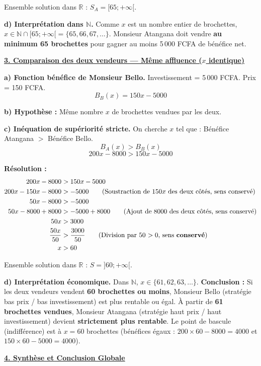 \documentclass[11pt]{article}
\begin{document}
\begin{exoresolu}
\noindent Ensemble solution dans $\mathbb{R}$ : $S_A = [65; +\infty[$.

\noindent \textbf{d) Interprétation dans $\mathbb{N}$.}
Comme $x$ est un nombre entier de brochettes, $x \in \mathbb{N} \cap [65; +\infty[ = \{65, 66, 67, \dots\}$.
Monsieur Atangana doit vendre \textbf{au minimum 65 brochettes} pour gagner au moins 5\,000 FCFA de bénéfice net.

\medskip
\textbf{\underline{3. Comparaison des deux vendeurs — Même affluence ($x$ identique)}}

\noindent \textbf{a) Fonction bénéfice de Monsieur Bello.}
Investissement = 5\,000 FCFA. Prix = 150 FCFA.
\[ B_B(x) = 150x - 5000 \]

\noindent \textbf{b) Hypothèse :} Même nombre $x$ de brochettes vendues par les deux.

\noindent \textbf{c) Inéquation de supériorité stricte.}
On cherche $x$ tel que : Bénéfice Atangana $>$ Bénéfice Bello.
\[ B_A(x) > B_B(x) \]
\[ 200x - 8000 > 150x - 5000 \]

\noindent \textbf{Résolution :}
\begin{align*}
200x - 8000 &> 150x - 5000 \\
200x - 150x - 8000 &> -5000 \qquad \text{(Soustraction de $150x$ des deux côtés, sens conservé)} \\
50x - 8000 &> -5000 \\
50x - 8000 + 8000 &> -5000 + 8000 \qquad \text{(Ajout de 8000 des deux côtés, sens conservé)} \\
50x &> 3000 \\
\dfrac{50x}{50} &> \dfrac{3000}{50} \qquad \text{(Division par 50 $> 0$, sens \textbf{conservé})} \\
x &> 60
\end{align*}

\noindent Ensemble solution dans $\mathbb{R}$ : $S = ]60; +\infty[$.

\noindent \textbf{d) Interprétation économique.}
Dans $\mathbb{N}$, $x \in \{61, 62, 63, \dots\}$.
\textbf{Conclusion :} Si les deux vendeurs vendent \textbf{60 brochettes ou moins}, Monsieur Bello (stratégie bas prix / bas investissement) est plus rentable ou égal.
À partir de \textbf{61 brochettes vendues}, Monsieur Atangana (stratégie haut prix / haut investissement) devient \textbf{strictement plus rentable}.
Le point de bascule (indifférence) est à $x = 60$ brochettes (bénéfices égaux : $200\times60-8000 = 4000$ et $150\times60-5000 = 4000$).

\medskip
\textbf{\underline{4. Synthèse et Conclusion Globale}}


\end{exoresolu}
\end{document}
